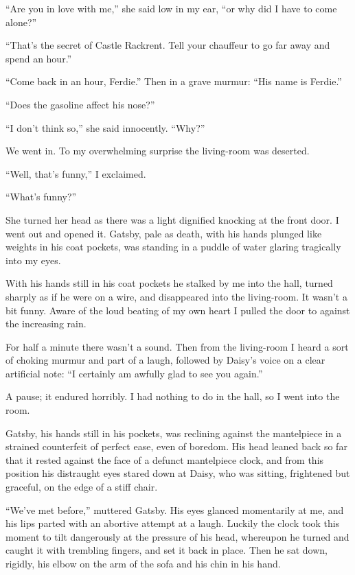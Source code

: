 \documentclass{znotebook}
\begin{document}
``Are you in love with me,'' she said low in my ear, ``or why did I have to come alone?''

``That’s the secret of Castle Rackrent. Tell your chauffeur to go far away and spend an hour.''

``Come back in an hour, Ferdie.'' Then in a grave murmur: ``His name is Ferdie.''

``Does the gasoline affect his nose?''

``I don’t think so,'' she said innocently. ``Why?''

We went in. To my overwhelming surprise the living-room was deserted.

``Well, that’s funny,'' I exclaimed.

``What’s funny?''

She turned her head as there was a light dignified knocking at the front door. I went out and opened it. Gatsby, pale as death, with his hands plunged like weights in his coat pockets, was standing in a puddle of water glaring tragically into my eyes.

With his hands still in his coat pockets he stalked by me into the hall, turned sharply as if he were on a wire, and disappeared into the living-room. It wasn’t a bit funny. Aware of the loud beating of my own heart I pulled the door to against the increasing rain.

For half a minute there wasn’t a sound. Then from the living-room I heard a sort of choking murmur and part of a laugh, followed by Daisy’s voice on a clear artificial note: ``I certainly am awfully glad to see you again.''

A pause; it endured horribly. I had nothing to do in the hall, so I went into the room.

Gatsby, his hands still in his pockets, was reclining against the mantelpiece in a strained counterfeit of perfect ease, even of boredom. His head leaned back so far that it rested against the face of a defunct mantelpiece clock, and from this position his distraught eyes stared down at Daisy, who was sitting, frightened but graceful, on the edge of a stiff chair.

``We’ve met before,'' muttered Gatsby. His eyes glanced momentarily at me, and his lips parted with an abortive attempt at a laugh. Luckily the clock took this moment to tilt dangerously at the pressure of his head, whereupon he turned and caught it with trembling fingers, and set it back in place. Then he sat down, rigidly, his elbow on the arm of the sofa and his chin in his hand.
\end{document}
